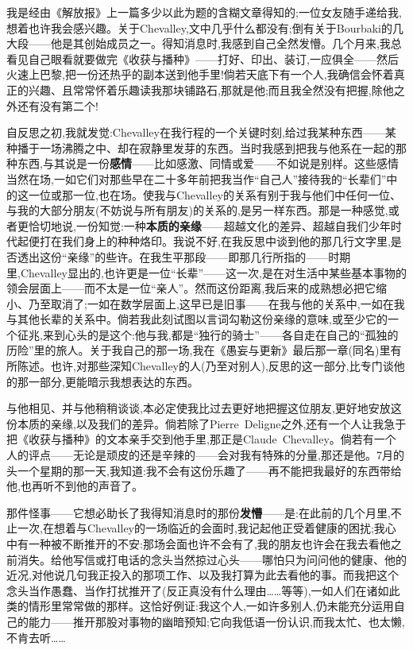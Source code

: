 我是经由《解放报》上一篇多少以此为题的含糊文章得知的;一位女友随手递给我,想着也许我会感兴趣。关于Chevalley,文中几乎什么都没有;倒有关于Bourbaki的几大段——他是其创始成员之一。得知消息时,我感到自己全然发懵。几个月来,我总看见自己眼看就要做完《收获与播种》——打好、印出、装订,一应俱全——然后火速上\dmark{}巴黎,把一份还热乎的副本送到他手里!倘若天底下有一个人,我确信会怀着真正的兴趣、且常常怀着乐趣读我那块铺路石,那就是他;而且我全然没有把握,除他之外还有没有第二个!

自反思之初,我就发觉:Chevalley在我行程的一个关键时刻,给过我某种东西——某种播于一场沸腾之中、却在寂静里发芽的东西。当时我感到把我与他系在一起的那种东西,与其说是一份\textbf{感情}——比如感激、同情或爱——不如说是别样。这些感情当然在场,一如它们对那些早在二十多年前把我当作“自己人”接待我的“长辈们”中的这一位或那一位,也在场。使我与Chevalley的关系有别于我与他们中任何一位、与我的大部分朋友(不妨说与所有朋友)的关系的,是另一样东西。那是一种感觉,或者更恰切地说,一份知觉:一种\textbf{本质的亲缘}——超越文化的差异、超越自我们少年时代起便打在我们身上的种种烙印。我说不好,在我反思中谈到他的那几行文字里,是否透出这份“亲缘”的些许。在我生平那段——即那几行所指的——时期里,Chevalley显出的,也许更是一位“长辈”——这一次,是在对生活中某些基本事物的领会层面上——而不太是一位“亲人”。然而这份距离,我后来的成熟想必把它缩小、乃至取消了;一如在数学层面上,这早已是旧事——在我与他的关系中,一如在我与其他长辈的关系中。倘若我此刻试图以言词勾勒这份亲缘的意味,或至少它的一个征兆,来到心头的是这个:他与我,都是“独行的骑士”——各自走在自己的“孤独的历险”里的旅人。关于我自己的那一场,我在《愚妄与更新》最后那一章(同名)里有所陈述。也许,对那些深知Chevalley的人(乃至对别人),反思的这一部分,比专门谈他的那一部分,更能暗示我想表达的东西。

与他相见、并与他稍稍谈谈,本必定使我比过去更好地把握这位朋友,更好地安放这份本质的亲缘,以及我们的差异。倘若除了Pierre~Deligne之外,还有一个人让我急于把《收获与播种》的文本亲手交到他手里,那正是Claude~Chevalley。\dmark{}倘若有一个人的评点——无论是顽皮的还是辛辣的——会对我有特殊的分量,那还是他。7月的头一个星期的那一天,我知道:我不会有这份乐趣了——再不能把我最好的东西带给他,也再听不到他的声音了。

那件怪事——它想必助长了我得知消息时的那份\textbf{发懵}——是:在此前的几个月里,不止一次,在想着与Chevalley的一场临近的会面时,我记起他正受着健康的困扰;我心中有一种被不断推开的不安:那场会面也许不会有了,我的朋友也许会在我去看他之前消失。给他写信或打电话的念头当然掠过心头——哪怕只为问问他的健康、他的近况,对他说几句我正投入的那项工作、以及我打算为此去看他的事。而我把这个念头当作愚蠢、当作打扰推开了(反正真没有什么理由……等等),一如人们在诸如此类的情形里常常做的那样。这恰好例证:我这个人,一如许多别人,仍未能充分运用自己的能力——推开那股对事物的幽暗预知;它向我低语一份认识,而我太忙、也太懒,不肯去听……

